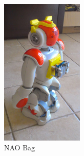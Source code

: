 \begin{figure}
	[h] \centering 
	\includegraphics[height=7cm]{figures/content/nao-bag.jpg} \caption{NAO Bag} \label{fg:nao:bag} 
\end{figure}
